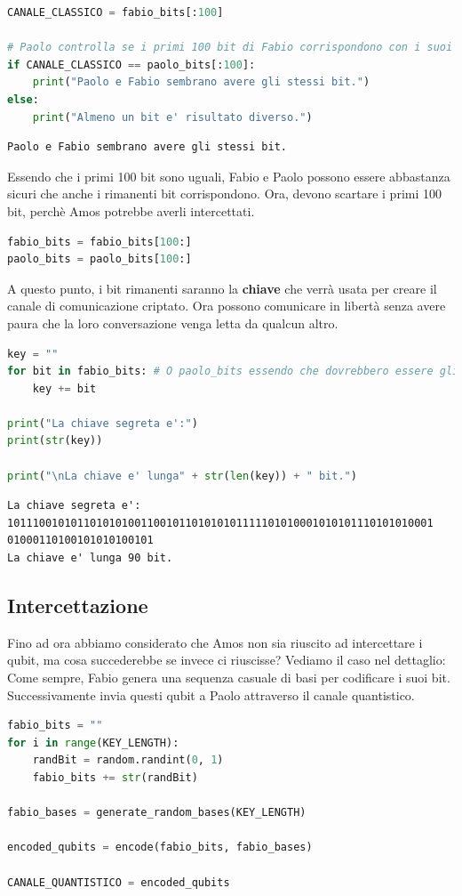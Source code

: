 \documentclass[a4paper]{article}
\begin{document}
\begin{lstlisting}[language=Python]
CANALE_CLASSICO = fabio_bits[:100] 

# Paolo controlla se i primi 100 bit di Fabio corrispondono con i suoi primi 100 bit
if CANALE_CLASSICO == paolo_bits[:100]:
    print("Paolo e Fabio sembrano avere gli stessi bit.")
else:
    print("Almeno un bit e' risultato diverso.")
\end{lstlisting}
\begin{lstlisting}[language=Python]
Paolo e Fabio sembrano avere gli stessi bit.
\end{lstlisting}
Essendo che i primi 100 bit sono uguali, Fabio e Paolo possono essere abbastanza sicuri
che anche i rimanenti bit corrispondono. Ora, devono scartare i primi 100 bit, perchè
Amos potrebbe averli intercettati.
\begin{lstlisting}[language=Python]
fabio_bits = fabio_bits[100:] 
paolo_bits = paolo_bits[100:] 
\end{lstlisting}
A questo punto, i bit rimanenti saranno la \textbf{chiave} che verrà usata per creare
il canale di comunicazione criptato. Ora possono comunicare in libertà senza avere paura che la
loro conversazione venga letta da qualcun altro.
\begin{lstlisting}[language=Python]
key = "" 
for bit in fabio_bits: # O paolo_bits essendo che dovrebbero essere gli stessi.
    key += bit

print("La chiave segreta e':")
print(str(key))

print("\nLa chiave e' lunga" + str(len(key)) + " bit.")
\end{lstlisting}
\begin{lstlisting}
La chiave segreta e':
1011100101011010101001100101101010101111101010001010101110101010001
01000110100101010100101
La chiave e' lunga 90 bit.
\end{lstlisting}

\subsection{Intercettazione} 

Fino ad ora abbiamo considerato che Amos non sia riuscito ad intercettare i qubit, ma cosa
succederebbe se invece ci riuscisse? Vediamo il caso nel dettaglio:\\
Come sempre, Fabio genera una sequenza casuale di basi per codificare i suoi bit.
Successivamente invia questi qubit a Paolo attraverso il canale quantistico.
\begin{lstlisting}[language=Python]
fabio_bits = ""
for i in range(KEY_LENGTH):
    randBit = random.randint(0, 1) 
    fabio_bits += str(randBit) 
 
fabio_bases = generate_random_bases(KEY_LENGTH)

encoded_qubits = encode(fabio_bits, fabio_bases)

CANALE_QUANTISTICO = encoded_qubits
\end{lstlisting}
\end{document}
